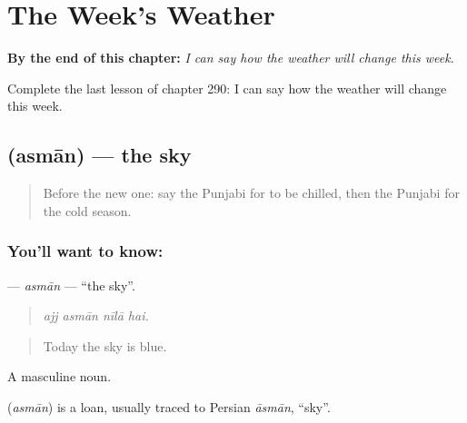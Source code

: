 
\chapter{The Week's Weather}
\label{ch:pa-a2-the-week-s-weather}

\begin{chapteropening}
\textbf{By the end of this chapter:} \emph{I can say how the weather will change this week.}

Complete the last lesson of chapter 290: I can say how the weather will change this week.
\end{chapteropening}

\section[\texorpdfstring{\pa{ਅਸਮਾਨ} (asmān)}{ਅਸਮਾਨ (asmān)}]{ (asmān) — the sky}

\label{lesson:PA-C290-asman}



\begin{quote}
Before the new one: say the Punjabi for to be chilled, then the Punjabi for the cold season.
\end{quote}

\subsection*{You'll want to know: }
\textbf{} — \emph{asmān} — \textquotedblleft{}the sky\textquotedblright{}.

\begin{quote}
   
\end{quote}

\begin{quote}
\emph{ajj asmān nīlā hai.}
\end{quote}

\begin{quote}
Today the sky is blue.
\end{quote}

A masculine noun.

\begin{cousinweb}
\textbf{} (\emph{asmān}) is a loan, usually traced to Persian \emph{āsmān}, \textquotedblleft{}sky\textquotedblright{}.
\end{cousinweb}

